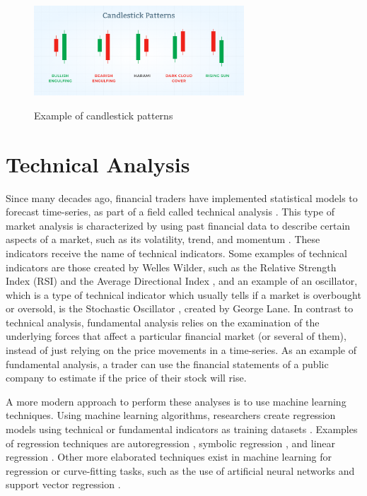 \begin{figure}
\caption{Example of candlestick patterns}
\centering
\includegraphics[width=0.7\textwidth]{img/candlestick-patterns.png}
\label{figure:candlestick-patterns}
\end{figure}

\section{Technical Analysis}
\label{section:technical-analysis}

Since many decades ago, financial traders have implemented statistical models to
forecast time-series, as part of a field called technical analysis
\cite{Lo2000}. This type of market analysis is characterized by using past
financial data to describe certain aspects of a market, such as its volatility,
trend, and momentum \cite{Achelis2000}. These indicators receive the name of
technical indicators. Some examples of technical indicators are those created by
Welles Wilder, such as the Relative Strength Index (RSI) and the Average
Directional Index \cite{Wilder1978}, and an example of an oscillator, which is a
type of technical indicator which usually tells if a market is overbought or
oversold, is the Stochastic Oscillator \cite{Schirding1984}, created by George
Lane. In contrast to technical analysis, fundamental analysis relies on the
examination of the underlying forces that affect a particular financial market
(or several of them), instead of just relying on the price movements in a
time-series. As an example of fundamental analysis, a trader can use the
financial statements of a public company to estimate if the price of their stock
will rise.

A more modern approach to perform these analyses is to use machine learning
techniques. Using machine learning algorithms, researchers create regression
models using technical or fundamental indicators as training datasets
\cite{Connor2005}.  Examples of regression techniques are autoregression
\cite{burg1968new}, symbolic regression \cite{billard2002symbolic}, and linear
regression \cite{kutner2004applied}. Other more elaborated techniques exist in
machine learning for regression or curve-fitting tasks, such as the use of
artificial neural networks \cite{melin2007hybrid} and support vector regression
\cite{basak2007support}.

